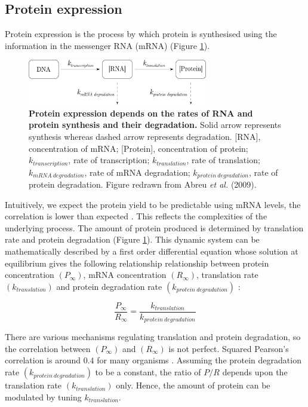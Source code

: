 \subsection{Protein expression}
Protein expression is the process by which protein is synthesised using the information in the messenger RNA (mRNA) (Figure \ref{fig:tranc_transl}). 


\begin{figure}[htbp!]
\center
\includegraphics[width=0.7\textwidth]{chapters/Introduction/Figures/transc_transl.pdf}
\caption[Protein expression depends on the rates of RNA and protein synthesis and their degradation.]{\textbf{Protein expression depends on the rates of RNA and protein synthesis and their degradation.} Solid arrow represents synthesis whereas dashed arrow represents degradation. [RNA], concentration of mRNA; [Protein], concentration of protein; $k_{transcription}$, rate of transcription; $k_{translation}$, rate of translation; $k_{mRNA\ degradation}$, rate of mRNA degradation; $k_{protein\ degradation}$, rate of protein degradation. Figure redrawn from Abreu \textit{et al.} (2009).}%
\label{fig:tranc_transl}
\end{figure}

Intuitively, we expect the protein yield to be predictable using mRNA levels, the correlation is lower than expected \cite{Abreu2009-zf, Taniguchi2010-uq, Bernstein2002-gg}. This reflects the complexities of the underlying process. The amount of protein produced is determined by translation rate and protein degradation (Figure \ref{fig:tranc_transl}).  This dynamic system can be mathematically described by a first order differential equation \cite{Abreu2009-zf} whose solution at equilibrium gives the following relationship relationship between protein concentration $(P_{\infty})$, mRNA concentration $(R_{\infty})$, translation rate $(k_{translation})$ and protein degradation rate $(k_{protein\ degradation})$ :

\begin{equation}
    \frac{P_{\infty}}{R_\infty} = \frac{k_{translation}}{k_{protein\ degradation}}
\end{equation}

There are various mechanisms regulating translation and protein degradation, so the correlation between $(P_{\infty})$ and $(R_{\infty})$ is not perfect. Squared Pearson's correlation is around $0.4$ for many organisms \cite{Abreu2009-zf}. Assuming the protein degradation rate $(k_{protein\ degradation})$ to be a constant, the ratio of $P/R$ depends upon the translation rate $(k_{translation})$ only. Hence, the amount of protein can be modulated by tuning  $k_{translation}$.

